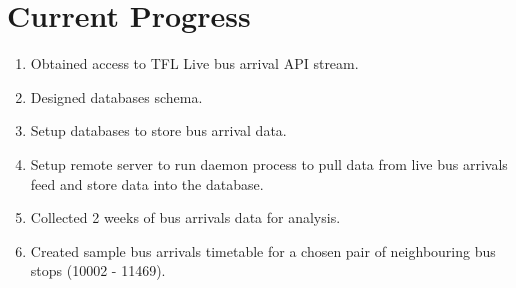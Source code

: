 \section{Current Progress}
\begin{enumerate}
  \item Obtained access to TFL Live bus arrival API stream.
  \item Designed databases schema.
  \item Setup databases to store bus arrival data.
  \item Setup remote server to run daemon process to pull data from live bus arrivals feed and store data into the database.
  \item Collected 2 weeks of bus arrivals data for analysis.
  \item Created sample bus arrivals timetable for a chosen pair of neighbouring bus stops (10002 - 11469).
\end{enumerate}

